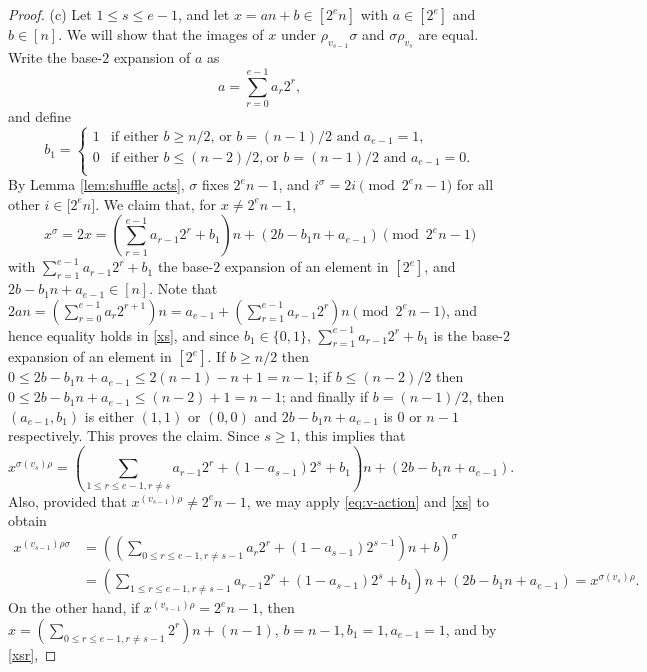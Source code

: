 \documentclass[12pt]{amsart}
\theoremstyle{remark}
\theoremstyle{definition}
\newcounter{claim}[thm]
\begin{document}
\begin{proof}
(c) Let $1\leqslant s\leqslant e-1$, and let $x=an+b\in [2^en]$ with $a\in[2^e]$ and $b\in [n]$. We will show that the images of $x$ under 
$\rho_{v_{s-1}}\sigma$  and $\sigma\rho_{v_s}$ are equal. Write the base-$2$ expansion of $a$ as 
\[
a=\sum_{r=0}^{e-1}a_{r}2^{r},
\] 
and define 
\[
b_1=\begin{cases}
	1 & \mbox{if either $b\geqslant n/2$,	}	\mbox{or $b=(n-1)/2$ and $a_{e-1}=1$,} \\
	0 & \mbox{if either $b\leqslant (n-2)/2$,}\ \mbox{or $b=(n-1)/2$ and $a_{e-1}=0$.} \\  
\end{cases} 
\]
By Lemma \ref{lem:shuffle acts}, $\sigma$ fixes $2^e n - 1$, and $i^\sigma = 2i \pmod{2^e n - 1}$ for all other $i \in \big[2^e n\big]$. 
We claim that, for $x\ne 2^en-1$, 
\begin{equation}\label{xs}
x^\sigma = 2x = (\sum_{r=1}^{e-1}a_{r-1}2^{r} + b_1) n + (2b-b_1n+a_{e-1}) \pmod{2^en-1}
\end{equation}
with $\sum_{r=1}^{e-1}a_{r-1}2^{r} + b_1$ the base-$2$ expansion of an element in $[2^e]$, and $2b-b_1n+a_{e-1}\in [n]$. Note that $2an=
(\sum_{r=0}^{e-1}a_{r}2^{r+1})n= a_{e-1} + (\sum_{r=1}^{e-1}a_{r-1}2^{r})n  \pmod{2^en-1}$, and hence equality holds in \eqref{xs},
and  since $b_1\in\{0,1\}$, $\sum_{r=1}^{e-1}a_{r-1}2^{r} + b_1$ is the base-$2$ expansion of an element in $[2^e]$. If $b\geqslant n/2$ then 
$0\leqslant 2b-b_1n+a_{e-1} \leqslant 2(n-1)-n+1=n-1$; if $b\leqslant (n-2)/2$ then $0\leqslant 2b-b_1n+a_{e-1} \leqslant (n-2)+1=n-1$; and finally if $b=(n-1)/2$, then 
$(a_{e-1},b_1)$ is either $(1,1)$ or $(0,0)$ and $2b-b_1n+a_{e-1}$ is $0$ or $n-1$ respectively. This proves the claim. 
Since $s\geqslant1$, this implies that 
\begin{equation}\label{xsr}
x^{\sigma(v_s)\rho}  = (\sum_{1\leqslant r\leqslant e-1, r\ne s}a_{r-1}2^{r} + (1-a_{s-1})2^s + b_1) n + (2b-b_1n+a_{e-1}).
\end{equation}
Also, provided that $x^{(v_{s-1})\rho}\ne 2^en-1$, we may apply \eqref{eq:v-action} and \eqref{xs} to obtain 
\begin{align*}
x^{(v_{s-1})\rho\sigma} &= \left(    (\sum_{0\leqslant r\leqslant e-1, r\ne s-1}a_{r}2^{r} + (1-a_{s-1})2^{s-1}) n+b\right)^\sigma \\
		&=   (\sum_{1\leqslant r\leqslant e-1, r\ne s-1}a_{r-1}2^{r} + (1-a_{s-1})2^{s}+b_1) n +  (2b-b_1n+a_{e-1})
		= x^{\sigma(v_s)\rho}.
\end{align*}
On the other hand, if $x^{(v_{s-1})\rho}= 2^en-1$, then $x= (\sum_{0\leqslant r\leqslant e-1, r\ne s-1}2^r )n+(n-1)$, $b=n-1, b_1=1, a_{e-1}=1$, and by \eqref{xsr},

\end{proof}
\end{document}
